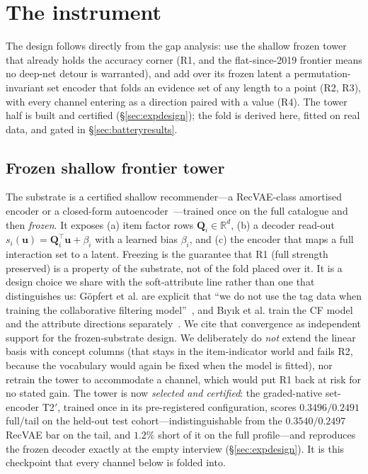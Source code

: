 \documentclass[11pt]{article}
\newcommand{\R}{\mathbb{R}}
\newcommand{\Q}{\mathbf{Q}}
\newcommand{\uu}{\mathbf{u}}
\begin{document}
\section{The instrument}\label{sec:method}

The design follows directly from the gap analysis: use the shallow frozen tower that already holds the accuracy
corner (R1, and the flat-since-2019 frontier means no deep-net detour is warranted), and add over its frozen latent
a permutation-invariant set encoder that folds an evidence set of any length to a point (R2, R3), with every
channel entering as a direction paired with a value (R4). The tower half is built and certified
(\S\ref{sec:expdesign}); the fold is derived here, fitted on real data, and gated in
\S\ref{sec:batteryresults}.

\subsection{Frozen shallow frontier tower}
The substrate is a certified shallow recommender---a RecVAE-class amortised encoder or a closed-form
autoencoder~\cite{ren2020recvae,steck2019ease}---trained once on the full catalogue and then \emph{frozen}. It exposes
(a) item factor rows $\Q_i\in\R^{d}$, (b) a decoder read-out $s_i(\uu)=\Q_i^\top\uu + \beta_i$ with a learned bias
$\beta_i$, and (c) the encoder that maps a full interaction set to a latent. Freezing is the guarantee that R1 (full strength preserved) is a property of the substrate, not of the
fold placed over it. It is a design choice we share with the soft-attribute line rather than one that distinguishes us:
G\"opfert et al. are explicit that ``we do not use the tag data when training the collaborative filtering
model''~\cite{gopfert2024cav}, and B\i y\i k et al. train the CF model and the attribute directions
separately~\cite{biyik2023soft}. We cite that convergence as independent support for the frozen-substrate design. We deliberately do \emph{not} extend the linear basis with concept columns
(that stays in the item-indicator world and fails R2, because the vocabulary would again be fixed when the
model is fitted), nor retrain the tower to accommodate a channel, which would put R1 back at risk for no
stated gain. The tower is now \emph{selected and certified}: the graded-native set-encoder T2$'$, trained
once in its pre-registered configuration, scores $0.3496/0.2491$ full/tail on the held-out test cohort---indistinguishable from
the $0.3540/0.2497$ RecVAE bar on the tail, and $1.2\%$ short of it on the full profile---and reproduces the frozen decoder exactly at the empty
interview (\S\ref{sec:expdesign}). It is this checkpoint that every channel below is folded into.
\end{document}
